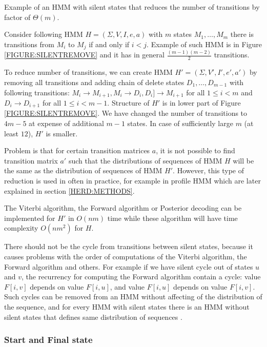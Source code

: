 \begin{example}
Example of an HMM with silent states that reduces the number of transitions by factor
of $\Theta(m)$.

Consider following HMM $H=(\Sigma,V,I,e,a)$ with $m$ states $M_1,\dots, M_m$
there is transitions from $M_i$ to $M_j$ if and only if $i<j$. Example of such
HMM is in Figure \ref{FIGURE:SILENTREMOVE} and it has in general
$\frac{(m-1)(m-2)}{2}$ transitions.

To reduce number of transitions, we can create HMM $H'=(\Sigma, V', I', e', a')$ by removing all
transitions and  adding chain of delete states $D_1,\dots, D_{m-1}$ with
following transitions: $M_i\to M_{i+1}, M_{i}\to D_{i}, D_{i}]\to M_{i+1}$ for
all $1\leq i<m$ and $D_{i}\to D_{i+1}$ for all $1\leq i<m-1$. Structure of $H'$
is in lower part of Figure \ref{FIGURE:SILENTREMOVE}. We have changed the
number of transitions to $4m-5$ at expense of additional $m-1$ states. In case
of sufficiently large $m$ (at least $12$), $H'$ is smaller. 

Problem is that for certain transition matrices $a$, it is not possible to find
transition matrix $a'$ such that the distributions of sequences of HMM $H$ will
be the same as the distribution of sequences of HMM $H'$. However, this type of
reduction is used in often in practice, for example in profile HMM
\cite{Durbin1998} which are later explained in section \ref{HERD:METHODS}.

The Viterbi algorithm, the Forward algorithm or Posterior decoding can be
implemented for $H'$ in $O(nm)$ time while these algorithm will have time
complexity $O(nm^2)$ for $H$.
\end{example}

There should not be the cycle from transitions between silent states, because
it causes problems with the order of computations of the Viterbi algorithm, the
Forward algorithm and others. For example if we have silent cycle out of states
$u$ and $v$, the recurrency for computing the Forward algorithm contain a
cycle: value $F[i, v]$ depends on value $F[i, u]$, and value $F[i,u]$ depends
on value $F[i, v]$.  Such cycles can be removed from an HMM without affecting
of the distribution of the sequence, and for every HMM with silent
states there is an HMM without silent states that defines same distribution of
sequences \cite{Nanasi2010mgr}.


\subsubsection{Start and Final state}

